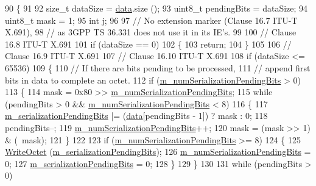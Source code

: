 \begin{DoxyCode}
90 \{
91 
92   \textcolor{keywordtype}{size\_t} dataSize = \hyperlink{topology-example-sim_8cc_a26c65296e316af77b787dc77469bb2a4}{data}.size ();
93   uint8\_t pendingBits = dataSize;
94   uint8\_t mask = 1;
95   \textcolor{keywordtype}{int} j;
96 
97   \textcolor{comment}{// No extension marker (Clause 16.7 ITU-T X.691),}
98   \textcolor{comment}{// as 3GPP TS 36.331 does not use it in its IE's.}
99 
100   \textcolor{comment}{// Clause 16.8 ITU-T X.691}
101   \textcolor{keywordflow}{if} (dataSize == 0)
102     \{
103       \textcolor{keywordflow}{return};
104     \}
105 
106   \textcolor{comment}{// Clause 16.9 ITU-T X.691}
107   \textcolor{comment}{// Clause 16.10 ITU-T X.691}
108   \textcolor{keywordflow}{if} (dataSize <= 65536)
109     \{
110       \textcolor{comment}{// If there are bits pending to be processed,}
111       \textcolor{comment}{// append first bits in data to complete an octet.}
112       \textcolor{keywordflow}{if} (\hyperlink{classns3_1_1Asn1Header_a663fc3287a1e7e4c383575e432480e6c}{m\_numSerializationPendingBits} > 0)
113         \{
114           mask = 0x80 >> \hyperlink{classns3_1_1Asn1Header_a663fc3287a1e7e4c383575e432480e6c}{m\_numSerializationPendingBits};
115           \textcolor{keywordflow}{while} (pendingBits > 0 && \hyperlink{classns3_1_1Asn1Header_a663fc3287a1e7e4c383575e432480e6c}{m\_numSerializationPendingBits} < 8)
116             \{
117               \hyperlink{classns3_1_1Asn1Header_ad48f6854caeba65c2631675cf416a2c9}{m\_serializationPendingBits} |= (\hyperlink{topology-example-sim_8cc_a26c65296e316af77b787dc77469bb2a4}{data}[pendingBits - 1]) ? mask : 
      0;
118               pendingBits--;
119               \hyperlink{classns3_1_1Asn1Header_a663fc3287a1e7e4c383575e432480e6c}{m\_numSerializationPendingBits}++;
120               mask = (mask >> 1) & (~mask);
121             \}
122 
123           \textcolor{keywordflow}{if} (\hyperlink{classns3_1_1Asn1Header_a663fc3287a1e7e4c383575e432480e6c}{m\_numSerializationPendingBits} >= 8)
124             \{
125               \hyperlink{classns3_1_1Asn1Header_ae4514f79e0370ceb678de99b4a6a59f0}{WriteOctet} (\hyperlink{classns3_1_1Asn1Header_ad48f6854caeba65c2631675cf416a2c9}{m\_serializationPendingBits});
126               \hyperlink{classns3_1_1Asn1Header_a663fc3287a1e7e4c383575e432480e6c}{m\_numSerializationPendingBits} = 0;
127               \hyperlink{classns3_1_1Asn1Header_ad48f6854caeba65c2631675cf416a2c9}{m\_serializationPendingBits} = 0;
128             \}
129         \}
130 
131       \textcolor{keywordflow}{while} (pendingBits > 0)

\end{DoxyCode}
